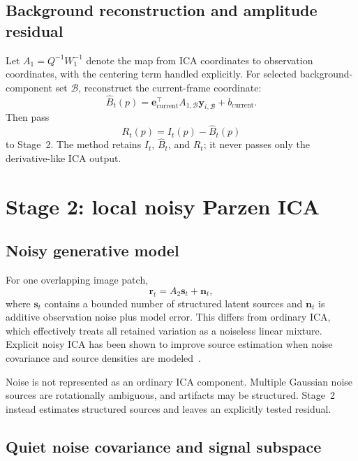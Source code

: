 \documentclass[11pt]{article}
\newcommand{\Bhat}{\widehat B}
\begin{document}
\subsection{Background reconstruction and amplitude residual}

Let \(A_1=Q^{-1}W_1^{-1}\) denote the map from ICA coordinates to observation
coordinates, with the centering term handled explicitly. For selected
background-component set \(\mathcal B\), reconstruct the current-frame
coordinate:
\begin{equation}
\Bhat_t(p)=
\bm e_{\mathrm{current}}^\top
A_{1,\mathcal B}\bm y_{i,\mathcal B} + b_{\mathrm{current}}.
\end{equation}
Then pass
\begin{equation}
R_t(p)=I_t(p)-\Bhat_t(p)
\label{eq:stage1-residual}
\end{equation}
to Stage~2. The method retains \(I_t\), \(\Bhat_t\), and \(R_t\); it never
passes only the derivative-like ICA output.

\section{Stage 2: local noisy Parzen ICA}

\subsection{Noisy generative model}

For one overlapping image patch,
\begin{equation}
\bm r_t=A_2\bm s_t+\bm n_t,
\label{eq:noisy-ica}
\end{equation}
where \(\bm s_t\) contains a bounded number of structured latent sources and
\(\bm n_t\) is additive observation noise plus model error. This differs from
ordinary ICA, which effectively treats all retained variation as a noiseless
linear mixture. Explicit noisy ICA has been shown to improve source estimation
when noise covariance and source densities are modeled~\cite{cordes2007}.

Noise is not represented as an ordinary ICA component. Multiple Gaussian noise
sources are rotationally ambiguous, and artifacts may be structured. Stage~2
instead estimates structured sources and leaves an explicitly tested residual.

\subsection{Quiet noise covariance and signal subspace}
\end{document}

